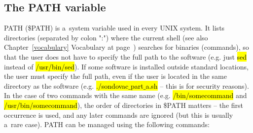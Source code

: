 \documentclass[a4paper, 11pt, twoside]{article}
\renewcommand{\texttt}[1]{\hl{\ttfamily #1}}
\begin{document}
\subsection{The PATH variable}

PATH (\$PATH) is a~system variable used in every UNIX system. It lists directories (separated by colon ":") where the current shell (see also Chapter~\ref{vocabulary} Vocabulary at page~\pageref{vocabulary}) searches for binaries (commands), so that the user does not have to specify the full path to the software (e.g. just \texttt{sed} instead of \texttt{/usr/bin/sed}). If some software is installed outside standard locations, the user must specify the full path, even if the user is located in the same directory as the software (e.g. \texttt{./sondovac$\_$part$\_$a.sh} -- this is for security reasons). In the case of two commands with the same name (e.g. \texttt{/bin/somecommand} and \texttt{/usr/bin/somecommand}), the order of directories in \$PATH matters -- the first occurrence is used, and any later commands are ignored (but this is usually a~rare case). PATH can be managed using the following commands:

\end{document}
